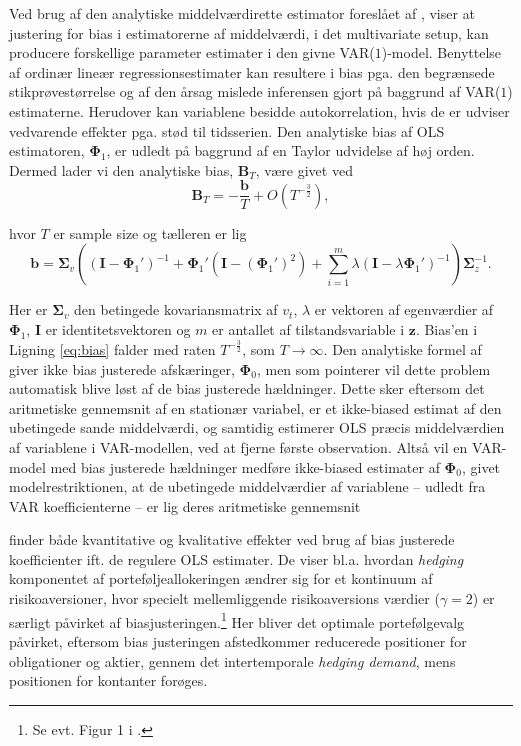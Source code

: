 \documentclass[
  a4paper,
  oneside]{memoir}
\begin{document}
Ved brug af den analytiske middelværdirette estimator foreslået af \citep{Pope1990}, viser \citep{Engsted2012} at justering for bias i estimatorerne af middelværdi, i det multivariate setup, kan producere forskellige parameter estimater i den givne VAR(\(1\))-model. Benyttelse af ordinær lineær regressionsestimater kan resultere i bias pga. den begrænsede stikprøvestørrelse og af den årsag mislede inferensen gjort på baggrund af VAR(\(1\)) estimaterne. Herudover kan variablene besidde autokorrelation, hvis de er udviser vedvarende effekter pga. stød til tidsserien. Den analytiske bias af OLS estimatoren, \(\bm{\Phi}_1\), er udledt på baggrund af en Taylor udvidelse af høj orden. Dermed lader vi den analytiske bias, \(\bm{B}_T\), være givet ved
\begin{equation}
\bm{B}_T=-\frac{\bm{b}}{T}+ O\left(T^{-\frac{3}{2}}\right), \label{eq:bias}
\end{equation}

hvor \(T\) er sample size og tælleren er lig
\[\bm{b}=\bm{\Sigma}_v\left(\left(\bm{I}-\bm{\Phi}_1'\right)^{-1}+\bm{\Phi}_1'\left(\bm{I}-\left(\bm{\Phi}_1'\right)^2\right)+\sum_{i=1}^m \lambda \left(\bm{I}-\lambda\bm{\Phi}_1'\right)^{-1}\right)\bm{\Sigma}_z^{-1}.\]

Her er \(\bm{\Sigma}_v\) den betingede kovariansmatrix af \(v_t\), \(\lambda\) er vektoren af egenværdier af \(\bm{\Phi}_1\), \(\bm{I}\) er identitetsvektoren og \(m\) er antallet af tilstandsvariable i \(\bm{z}\). Bias'en i Ligning \eqref{eq:bias} falder med raten \(T^{-\frac{3}{2}}\), som \(T\rightarrow \infty\). Den analytiske formel af \citep{Pope1990} giver ikke bias justerede afskæringer, \(\bm{\Phi}_0\), men som \citep{Engsted2012} pointerer vil dette problem automatisk blive løst af de bias justerede hældninger. Dette sker eftersom det aritmetiske gennemsnit af en stationær variabel, er et ikke-biased estimat af den ubetingede sande middelværdi, og samtidig estimerer OLS præcis middelværdien af variablene i VAR-modellen, ved at fjerne første observation. Altså vil en VAR-model med bias justerede hældninger medføre ikke-biased estimater af \(\bm{\Phi}_0\), givet modelrestriktionen, at de ubetingede middelværdier af variablene -- udledt fra VAR koefficienterne -- er lig deres aritmetiske gennemsnit

\citep{Engsted2012} finder både kvantitative og kvalitative effekter ved brug af bias justerede koefficienter ift. de regulere OLS estimater. De viser bl.a. hvordan \emph{hedging} komponentet af porteføljeallokeringen ændrer sig for et kontinuum af risikoaversioner, hvor specielt mellemliggende risikoaversions værdier (\(\gamma=2\)) er særligt påvirket af biasjusteringen.\footnote{Se evt. Figur 1 i \citep{Engsted2012}.} Her bliver det optimale portefølgevalg påvirket, eftersom bias justeringen afstedkommer reducerede positioner for obligationer og aktier, gennem det intertemporale \emph{hedging demand}, mens positionen for kontanter forøges.
\end{document}
